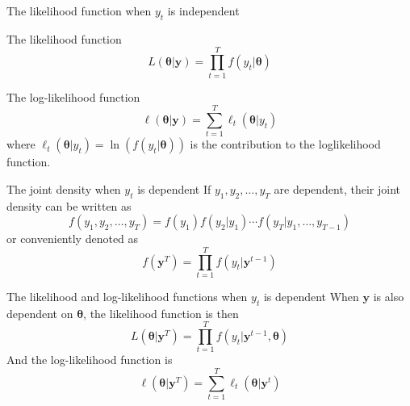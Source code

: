 \documentclass[presentation,10pt]{beamer}
\begin{document}
\begin{frame}[label={sec:org8d659f8}]{The likelihood function when \(y_t\) is independent}
\begin{block}{The likelihood function}
\begin{equation}
\label{eq:general-likelihood}
L(\boldsymbol{\theta} | \mathbf{y}) = \prod_{t=1}^T f(y_t | \boldsymbol{\theta})
\end{equation}
\end{block}

\begin{block}{The log-likelihood function}
\begin{equation}
\label{eq:general-logL}
\ell(\boldsymbol{\theta} | \mathbf{y}) = \sum_{t=1}^T \ell_t(\boldsymbol{\theta} | y_t)
\end{equation}
where \(\ell_t(\boldsymbol{\theta} | y_t) = \ln\left(f(y_t |
\boldsymbol{\theta})\right)\) is the \alert{contribution} to the
loglikelihood function.
\end{block}
\end{frame}

\begin{frame}[label={sec:orgc1f6a19}]{The joint density when \(y_t\) is dependent}
If \(y_1, y_2, \ldots, y_T\) are dependent, their joint density can be
written as
\[ f(y_1, y_2, \ldots, y_T) = f(y_1) f(y_2 | y_1) \cdots f(y_T | y_1,
\ldots, y_{T-1}) \]
or conveniently denoted as
\[f(\mathbf{y}^T) = \prod_{t=1}^T f(y_t | \mathbf{y}^{t-1}) \]
\end{frame}

\begin{frame}[label={sec:org0c3f548}]{The likelihood and log-likelihood functions when \(y_t\) is dependent}
When \(\mathbf{y}\) is also dependent on \(\boldsymbol{\theta}\), the
likelihood function is then
\begin{equation}
\label{eq:depend-likelihood}
L(\boldsymbol{\theta} | \mathbf{y}^T) = \prod_{t=1}^T f(y_t | \mathbf{y}^{t-1}, \boldsymbol{\theta})
\end{equation}
And the log-likelihood function is
\begin{equation}
\label{eq:depend-logL}
\ell(\boldsymbol{\theta} | \mathbf{y}^T) = \sum_{t=1}^T \ell_t(\boldsymbol{\theta} | \mathbf{y}^{t})
\end{equation}
\end{frame}
\end{document}
